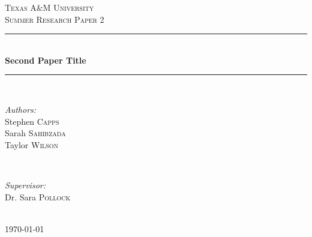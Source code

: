 \documentclass[11pt]{article}
\begin{document}
\begin{titlepage}

\newcommand{\HRule}{\rule{\linewidth}{0.5mm}} 

\center %
 

\textsc{\LARGE Texas A$\&$M University}\\[1.5cm] 
\textsc{\Large Summer Research Paper 2}\\[0.5cm] %


\HRule \\[0.4cm]
{ \huge \bfseries Second Paper Title}\\[0.4cm] 
\HRule \\[1.5cm]
 

\begin{minipage}{0.4\textwidth}
\begin{flushleft} \large
\emph{Authors:}\\
Stephen \textsc{Capps}\\
Sarah \textsc{Sahibzada}\\
Taylor \textsc{Wilson}
\end{flushleft}
\end{minipage}
~
\begin{minipage}{0.4\textwidth}
\begin{flushright} \large
\emph{Supervisor:} \\
Dr. Sara \textsc{Pollock} 
\end{flushright}
\end{minipage}\\[4cm]


{\large \today}\\[3cm] 


\end{titlepage}
\end{document}
